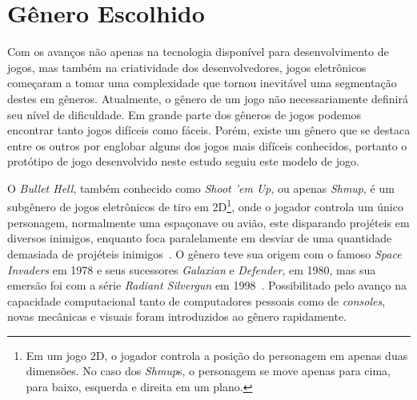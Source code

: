 \section{Gênero Escolhido}

Com os avanços não apenas na tecnologia disponível para desenvolvimento de jogos, mas também na criatividade dos desenvolvedores, jogos eletrônicos começaram a tomar uma complexidade que tornou inevitável uma segmentação destes em gêneros. Atualmente, o gênero de um jogo não necessariamente definirá seu nível de dificuldade. Em grande parte dos gêneros de jogos podemos encontrar tanto jogos difíceis como fáceis. Porém, existe um gênero que se destaca entre os outros por englobar alguns dos jogos mais difíceis conhecidos, portanto o protótipo de jogo desenvolvido neste estudo seguiu este modelo de jogo.

O \textit{Bullet Hell}, também conhecido como \textit{Shoot 'em Up}, ou apenas \textit{Shmup}, é um subgênero de jogos eletrônicos de tiro em 2D\footnote{
    Em um jogo 2D, o jogador controla a posição do personagem em apenas duas dimensões. No caso dos \textit{Shmup}s, o personagem se move apenas para cima, para baixo, esquerda e direita em um plano.
}, onde o jogador controla um único personagem, normalmente uma espaçonave ou avião, este disparando projéteis em diversos inimigos, enquanto foca paralelamente em desviar de uma quantidade demasiada de projéteis inimigos~\citep{STG}. O gênero teve sua origem com o famoso \textit{Space Invaders} em 1978 e seus sucessores \textit{Galaxian} e \textit{Defender}, em 1980, mas sua emersão foi com a série \textit{Radiant Silvergun} em 1998~\citep{Geemu}. Possibilitado pelo avanço na capacidade computacional tanto de computadores pessoais como de \textit{consoles}, novas mecânicas e visuais foram introduzidos ao gênero rapidamente.